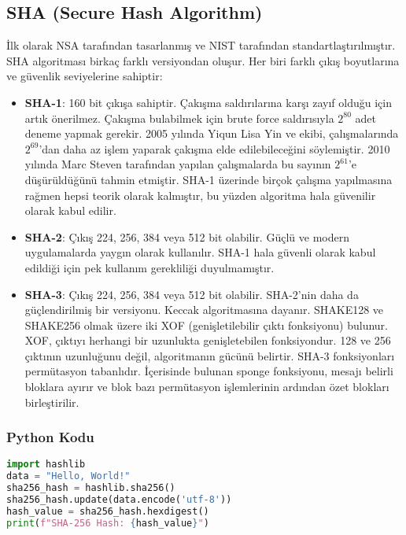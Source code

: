 \newpage

\subsection{SHA (Secure Hash Algorithm)}

İlk olarak NSA tarafından tasarlanmış ve NIST tarafından standartlaştırılmıştır. SHA algoritması birkaç farklı versiyondan oluşur. Her biri farklı çıkış boyutlarına ve güvenlik seviyelerine sahiptir:

\begin{itemize}
    \item \textbf{SHA-1}: 160 bit çıkışa sahiptir. Çakışma saldırılarına karşı zayıf olduğu için artık önerilmez. Çakışma bulabilmek için brute force saldırısıyla $2^{80}$ adet deneme yapmak gerekir. 2005 yılında Yiqun Lisa Yin ve ekibi, çalışmalarında $2^{69}$'dan daha az işlem yaparak çakışma elde edilebileceğini söylemiştir. 2010 yılında Marc Steven tarafından yapılan çalışmalarda bu sayının $2^{61}$'e düşürüldüğünü tahmin etmiştir. SHA-1 üzerinde birçok çalışma yapılmasına rağmen hepsi teorik olarak kalmıştır, bu yüzden algoritma hala güvenilir olarak kabul edilir.
    \item \textbf{SHA-2}: Çıkış 224, 256, 384 veya 512 bit olabilir. Güçlü ve modern uygulamalarda yaygın olarak kullanılır. SHA-1 hala güvenli olarak kabul edildiği için pek kullanım gerekliliği duyulmamıştır.
    \item \textbf{SHA-3}: Çıkış 224, 256, 384 veya 512 bit olabilir. SHA-2'nin daha da güçlendirilmiş bir versiyonu. Keccak algoritmasına dayanır. SHAKE128 ve SHAKE256 olmak üzere iki XOF (genişletilebilir çıktı fonksiyonu) bulunur. XOF, çıktıyı herhangi bir uzunlukta genişletebilen fonksiyondur. 128 ve 256 çıktının uzunluğunu değil, algoritmanın gücünü belirtir. SHA-3 fonksiyonları permütasyon tabanlıdır. İçerisinde bulunan sponge fonksiyonu, mesajı belirli bloklara ayırır ve blok bazı permütasyon işlemlerinin ardından özet blokları birleştirilir. 
\end{itemize}

\subsubsection{Python Kodu}

\begin{lstlisting}[language=Python]
import hashlib
data = "Hello, World!"
sha256_hash = hashlib.sha256()
sha256_hash.update(data.encode('utf-8'))
hash_value = sha256_hash.hexdigest()
print(f"SHA-256 Hash: {hash_value}")
\end{lstlisting}

